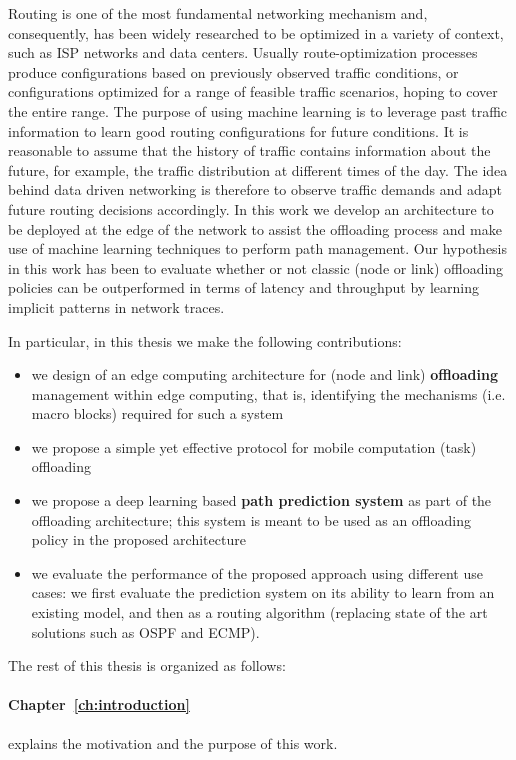 Routing is one of the most fundamental networking mechanism and, consequently, has been widely researched to be optimized in a variety of context, such as ISP networks and data centers. Usually route-optimization processes produce configurations based on previously observed traffic conditions, or configurations optimized for a range of feasible traffic scenarios, hoping to cover the entire range. The purpose of using machine learning is to leverage past traffic information to learn good routing configurations for future conditions. It is reasonable to assume that the history of traffic contains information about the future, for example, the traffic distribution at different times of the day. The idea behind data driven networking is therefore to observe traffic demands and adapt future routing decisions accordingly. In this work we develop an architecture to be deployed at the edge of the network to assist the offloading process and make use of machine learning techniques to perform path management. Our hypothesis in this work has been to evaluate whether or not classic (node or link) offloading policies can be outperformed in terms of latency and throughput by learning implicit patterns in network traces.

In particular, in this thesis we make the following contributions:
\begin{itemize}
\item we design of an edge computing architecture for (node and link) \textbf{offloading} management within edge computing, that is, identifying the mechanisms (i.e. macro blocks) required for such a system
\item we propose a simple yet effective protocol for mobile computation (task) offloading 
\item we propose a deep learning based \textbf{path prediction system} as part of the offloading architecture; this system is meant to be used as an offloading policy in the proposed architecture 
\item we evaluate the performance of the proposed  approach using different use cases: we  first evaluate the prediction system on its ability to learn from an existing model, and then as a routing algorithm (replacing state of the art solutions such as OSPF and ECMP).
\end{itemize}

The rest of this thesis is organized as follows:
\paragraph{Chapter~\ref{ch:introduction}} explains the motivation and the	purpose of this work.
